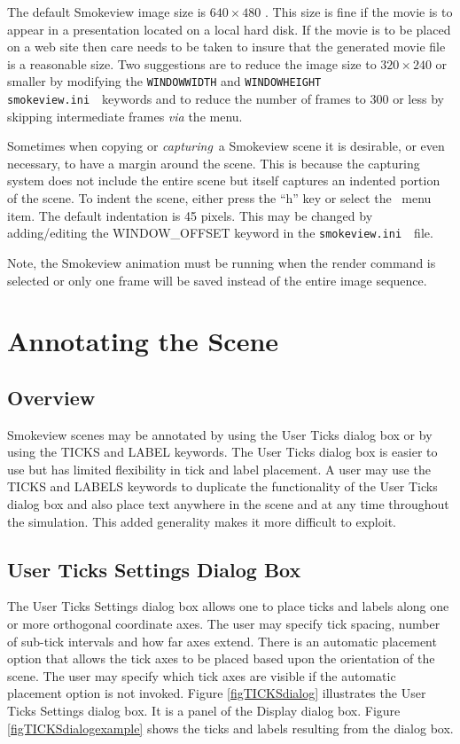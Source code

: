 \documentclass[11pt,twoside]{book}
\newcommand{\svini}{{\tt smokeview.ini}\ }
\newcommand{\frameit}[1]{\fbox{\tt #1}}
\begin{document}
The default Smokeview image size is $640\times 480$ .  This size
is fine if the movie is to appear in a presentation located on a
local hard disk.  If the movie is to be placed on a web site then
care needs to be taken to insure that the generated movie file is
a reasonable size.  Two suggestions are to reduce the image size
to $320\times 240$ or smaller by modifying the {\tt WINDOWWIDTH}
and {\tt WINDOWHEIGHT} \svini\ keywords  and to reduce the
number of frames to 300 or less by skipping intermediate frames
{\em via} the \frameit{Options/Render} menu.

Sometimes when copying or {\em capturing}\ a Smokeview scene it is
desirable, or even necessary, to have a margin around the scene.
This is because the capturing system does not include the entire
scene but itself captures an indented portion of the scene. To
indent the scene, either press the ``h'' key or select the
\ menu item. The
default indentation is 45 pixels. This may be changed by
adding/editing the WINDOW\_OFFSET keyword in the \svini\
file.

Note, the Smokeview animation must be running when the render command is selected or only one frame will be saved instead of the entire image sequence.

\chapter{Annotating the Scene }
\label{section:annotate} \label{subsect_features}
\section{Overview}
Smokeview scenes may be annotated by using the User Ticks dialog box or
by using the TICKS and LABEL keywords.  The User Ticks dialog box is
easier to use but  has limited flexibility in tick and label placement.
A user may use the TICKS and LABELS keywords to duplicate the functionality
of the User Ticks dialog box and also place text anywhere in the scene
and at any time throughout the simulation.  This added generality makes
it more difficult to exploit.


\section{User Ticks Settings Dialog Box}
The User Ticks Settings dialog box allows one to place
ticks and labels along one or more orthogonal coordinate axes.
The user may specify tick spacing, number of sub-tick intervals and how far  axes extend.  There is an automatic
placement option that allows the tick axes to be placed based upon
the orientation of the scene.  The user may specify which tick axes are visible if the automatic placement option is not
invoked.  Figure \ref{figTICKSdialog} illustrates the User Ticks Settings
dialog box.  It is a panel of the Display dialog box.  Figure \ref{figTICKSdialogexample} shows the ticks and labels resulting from the dialog box.
\end{document}
